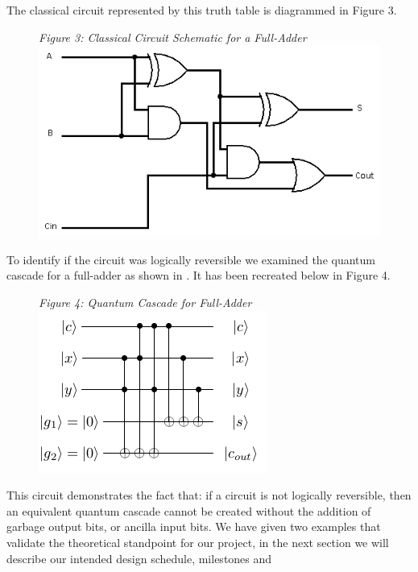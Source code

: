 \documentclass{IEEEtran}
\begin{document}
The classical circuit represented by this truth table is diagrammed in Figure 3.

\begin{figure}[h!]
\begin{center}
\textit{\small{\label{fig:cfa}Figure 3: Classical Circuit Schematic for a Full-Adder}}
  \includegraphics[scale=0.4]{figures/fulladder.png}
\end{center}
\end{figure}

To identify if the circuit was logically reversible we examined the quantum cascade for a full-adder as shown in \cite{qcagi}. It has been recreated below in Figure 4.

\begin{figure}[H]
\begin{center}
\textit{\small{\label{fig:qfa}Figure 4: Quantum Cascade for Full-Adder}} 
  \includegraphics[scale=0.6]{figures/Full_adder_qc.png}
\end{center}
\end{figure}


This circuit demonstrates the fact that: if a circuit is not logically reversible, then an equivalent quantum cascade cannot be created without the addition of garbage output bits, or ancilla input bits.
We have given two examples that validate the theoretical standpoint for our project, in the next section we will describe our intended design schedule, milestones and 
\end{document}
